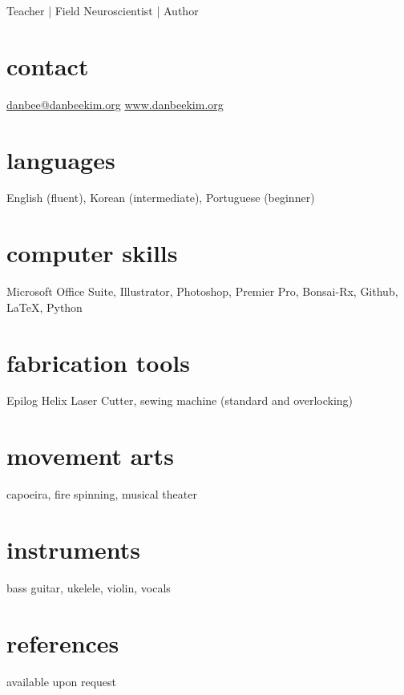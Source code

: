 \documentclass[10pt, a4]{friggeri-cv}
\begin{document}
       {Teacher | Field Neuroscientist | Author}


\begin{aside}
  \section{contact}
    \href{mailto:danbee@danbeekim.org}{danbee@danbeekim.org}
    \href{www.danbeekim.org}{www.danbeekim.org}
  \section{languages}
    English (fluent),
    Korean (intermediate),
    Portuguese (beginner)
  \section{computer skills}
    Microsoft Office Suite, 
	Illustrator, Photoshop, 
	Premier Pro, Bonsai-Rx, 
	Github, \LaTeX, Python
  \section{fabrication tools}
    Epilog Helix Laser Cutter, sewing machine (standard and overlocking)
  \section{movement arts}
    capoeira, fire spinning,
    musical theater
  \section{instruments}
    bass guitar, ukelele,
    violin, vocals
  \section{references}
    available upon request        
\end{aside}

\end{document}
